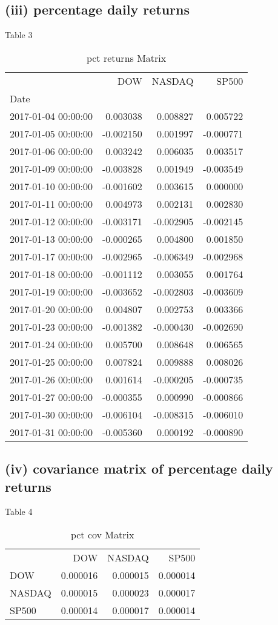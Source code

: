 \documentclass{article}
\begin{document}
\subsection*{(iii) percentage daily returns}{Table 3}
\begin{table}
\caption{pct returns Matrix}
\label{tab:pct_returns}
\begin{tabular}{lrrr}
 & DOW & NASDAQ & SP500 \\
Date &  &  &  \\
2017-01-04 00:00:00 & 0.003038 & 0.008827 & 0.005722 \\
2017-01-05 00:00:00 & -0.002150 & 0.001997 & -0.000771 \\
2017-01-06 00:00:00 & 0.003242 & 0.006035 & 0.003517 \\
2017-01-09 00:00:00 & -0.003828 & 0.001949 & -0.003549 \\
2017-01-10 00:00:00 & -0.001602 & 0.003615 & 0.000000 \\
2017-01-11 00:00:00 & 0.004973 & 0.002131 & 0.002830 \\
2017-01-12 00:00:00 & -0.003171 & -0.002905 & -0.002145 \\
2017-01-13 00:00:00 & -0.000265 & 0.004800 & 0.001850 \\
2017-01-17 00:00:00 & -0.002965 & -0.006349 & -0.002968 \\
2017-01-18 00:00:00 & -0.001112 & 0.003055 & 0.001764 \\
2017-01-19 00:00:00 & -0.003652 & -0.002803 & -0.003609 \\
2017-01-20 00:00:00 & 0.004807 & 0.002753 & 0.003366 \\
2017-01-23 00:00:00 & -0.001382 & -0.000430 & -0.002690 \\
2017-01-24 00:00:00 & 0.005700 & 0.008648 & 0.006565 \\
2017-01-25 00:00:00 & 0.007824 & 0.009888 & 0.008026 \\
2017-01-26 00:00:00 & 0.001614 & -0.000205 & -0.000735 \\
2017-01-27 00:00:00 & -0.000355 & 0.000990 & -0.000866 \\
2017-01-30 00:00:00 & -0.006104 & -0.008315 & -0.006010 \\
2017-01-31 00:00:00 & -0.005360 & 0.000192 & -0.000890 \\
\end{tabular}
\end{table}

\subsection*{(iv) covariance matrix of percentage daily returns}{Table 4}
\begin{table}
\caption{pct cov Matrix}
\label{tab:pct_cov}
\begin{tabular}{lrrr}
 & DOW & NASDAQ & SP500 \\
DOW & 0.000016 & 0.000015 & 0.000014 \\
NASDAQ & 0.000015 & 0.000023 & 0.000017 \\
SP500 & 0.000014 & 0.000017 & 0.000014 \\
\end{tabular}
\end{table}
\end{document}

